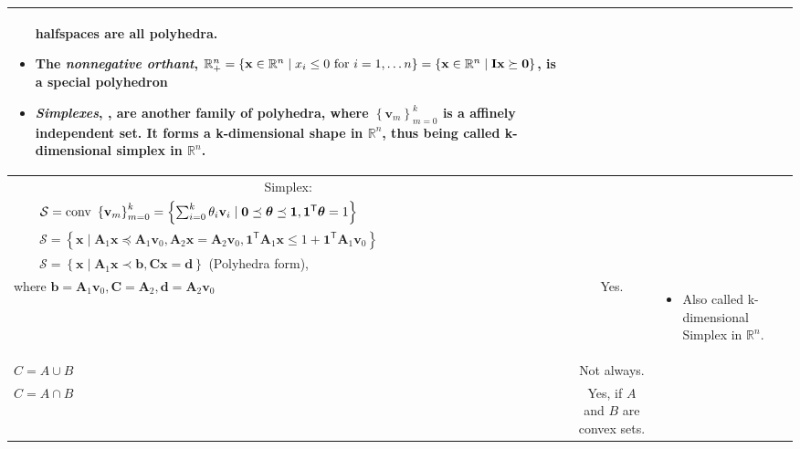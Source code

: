 \documentclass{article}
\newcommand{\trans}{\mathsf{T}}
\newcommand{\tabitem}{~~\llap{\textbullet}~~}
\begin{document}
\begin{landscape}
\begin{table}
\begin{tabular}{|l|c|p{7cm}|}
\begin{itemize}[leftmargin=*]
            halfspaces are all polyhedra.
            \item The \emph{nonnegative orthant}, \(\mathbb{R}_{+}^{n} = \left\{ \mathbf{x} \in \mathbb{R}^n \mid x_i \leq 0 \textnormal{ for } i=1,\dots n \right\} = \left\{ \mathbf{x} \in \mathbb{R}^n \mid \mathbf{Ix}  \succeq \mathbf{0}\right\}\), is a special polyhedron
            \item \emph{Simplexes}, , are another family of polyhedra, where \(\left\{ \mathbf{v}_m \right\}_{m=0}^{k}\) is a affinely independent set. It forms a k-dimensional shape in \(\mathbb{R}^{n}\), thus being called k-dimensional simplex in \(\mathbb{R}^{n}\).
        \end{itemize} \\
        \hline
            \multicolumn{1}{|c|}{Simplex:} \\
            \tabitem \(\mathcal{S} = \textnormal{conv }\left\{ \mathbf{v}_m \right\}_{m=0}^{k} = \left\{ \sum_{i=0}^{k} \theta_i \mathbf{v}_i \mid \mathbf{0} \preceq \boldsymbol{\theta} \preceq \mathbf{1}, \mathbf{1}^\trans \boldsymbol{\theta} = 1 \right\}\) \\
            \tabitem \(\mathcal{S} = \left\{ \mathbf{x} \mid \mathbf{A}_1 \mathbf{x} \preceq \mathbf{A}_1 \mathbf{v}_0, \mathbf{A}_2 \mathbf{x} = \mathbf{A}_2 \mathbf{v}_0, \mathbf{1}^\trans \mathbf{A}_1 \mathbf{x} \leq 1 + \mathbf{1}^\trans\mathbf{A}_1 \mathbf{v}_0 \right\}\) \\
            \tabitem \(\mathcal{S} = \left\{ \mathbf{x} \mid \mathbf{A}_1 \mathbf{x} \prec \mathbf{b}, \mathbf{Cx} = \mathbf{d} \right\}\) (Polyhedra form),\\ where \(\mathbf{b} = \mathbf{A}_1 \mathbf{v}_0, \mathbf{C}=\mathbf{A}_2, \mathbf{d} = \mathbf{A}_2 \mathbf{v}_0\) & Yes. & \begin{itemize}[leftmargin=*]
            \item Also called k-dimensional Simplex in \(\mathbb{R}^{n}\).
            \end{itemize} \\
        \hline
        $C = A \cup B $ & Not always. &  \\
        \hline
        $C = A \cap B $ & Yes, if $A$ and $B$ are convex sets. & \\
        \hline
    \end{tabular}
    
\end{table}
\end{landscape}
\end{document}
